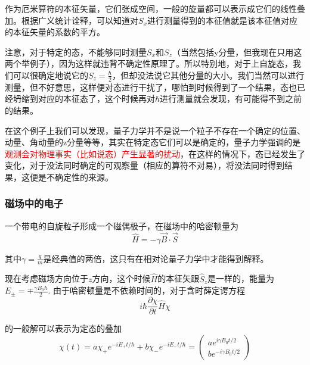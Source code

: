 \documentclass[UTF8]{ctexart}
\newcommand{\red}{\textcolor{red}}
\begin{document}
\noindent 作为厄米算符的本征矢量，它们张成空间，一般的旋量都可以表示成它们的线性叠加。根据广义统计诠释，可以知道对$S_x$进行测量得到的本征值就是该本征值对应的本征矢量的系数的平方。

    注意，对于特定的态，不能够同时测量$S_x$和$S_z$（当然包括y分量，但我现在只用这两个举例子），因为这样就违背不确定性原理了。所以特别地，对于上自旋态，我们可以很确定地说它的$S_z = \frac{\hbar}{2}$，但却没法说它其他分量的大小。我们当然可以进行测量，但不好意思，这样便对态进行干扰了，哪怕到时候得到了一个结果，态也已经坍缩到对应的本征态了，这个时候再对$\hbar$进行测量就会发现，有可能得不到之前的结果。

    在这个例子上我们可以发现，量子力学并不是说一个粒子不存在一个确定的位置、动量、角动量的z分量等等，其实在特定态它们可以是确定的，量子力学强调的是\red{观测会对物理事实（比如说态）产生显著的扰动}，在这样的情况下，态已经发生了变化，对于没法同时确定的可观察量（相应的算符不对易），将没法同时得到结果，这便是不确定性的来源。

    \subsubsection{磁场中的电子}
    一个带电的自旋粒子形成一个磁偶极子，在磁场中的哈密顿量为
    \begin{equation}
        \hat{H} = - \gamma \vec{B} \cdot \vec{S}
    \end{equation}

\noindent 其中$\gamma = \frac{q}{m}$是经典值的两倍，这只有在相对论量子力学中才能得到解释。

    现在考虑磁场方向位于$z$方向，这个时候$\hat{H}$的本征矢跟$\hat{S}_z$是一样的，能量为$E_{\pm} = \mp \frac{\gamma B_0 \hbar}{2}$. 由于哈密顿量是不依赖时间的，对于含时薛定谔方程
    \begin{equation}
        i \hbar \frac{\partial \chi}{\partial t} \hat{H} \chi 
    \end{equation}

\noindent 的一般解可以表示为定态的叠加
\begin{equation}
\chi(t)=a \chi_{+} e^{-i E_{+} t / \hbar}+b \chi_{-} e^{-i E_{-} t / \hbar}=\left(\begin{array}{c}{a e^{i \gamma B_{0} t / 2}} \\ {b e^{-i \gamma B_{0} t / 2}}\end{array}\right)
\end{equation}
\end{document}
